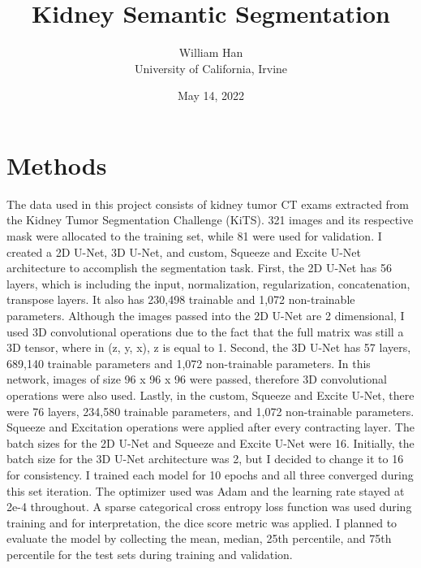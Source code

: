 \documentclass [12pt, letterpaper] {article}
\title{Kidney Semantic Segmentation}
\author{William Han \\ University of California, Irvine}
\date{May 14, 2022}
\begin{document}
\maketitle

\section{Methods}

The data used in this project consists of kidney tumor CT exams extracted from the Kidney Tumor Segmentation Challenge (KiTS). 321 images and its respective mask were allocated to the training set, while 81 were used for validation. I created a 2D U-Net, 3D U-Net, and custom, Squeeze and Excite U-Net architecture to accomplish the segmentation task. First, the 2D U-Net has 56 layers, which is including the input, normalization, regularization, concatenation, transpose layers. It also has 230,498 trainable and 1,072 non-trainable parameters. Although the images passed into the 2D U-Net are 2 dimensional, I used 3D convolutional operations due to the fact that the full matrix was still a 3D tensor, where in (z, y, x), z is equal to 1. Second, the 3D U-Net has 57 layers, 689,140 trainable parameters and 1,072 non-trainable parameters. In this network, images of size 96 x 96 x 96 were passed, therefore 3D convolutional operations were also used. Lastly, in the custom, Squeeze and Excite U-Net, there were 76 layers, 234,580 trainable parameters, and 1,072 non-trainable parameters. Squeeze and Excitation operations were applied after every contracting layer. The batch sizes for the 2D U-Net and Squeeze and Excite U-Net were 16. Initially, the batch size for the 3D U-Net architecture was 2, but I decided to change it to 16 for consistency. I trained each model for 10 epochs and all three converged during this set iteration. The optimizer used was Adam and the learning rate stayed at 2e-4 throughout. A sparse categorical cross entropy loss function was used during training and for interpretation, the dice score metric was applied. I planned to evaluate the model by collecting the mean, median, 25th percentile, and 75th percentile for the test sets during training and validation. 
\end{document}
